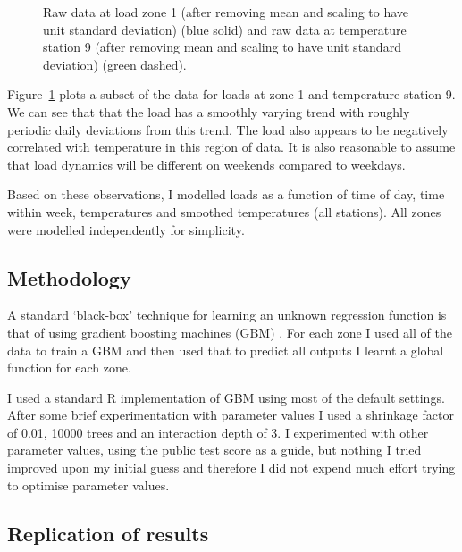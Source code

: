 \label{sec:gbm_init_anal}

\begin{figure}[ht]
  \begin{center}
    
  \end{center}
  \caption{Raw data at load zone 1 (after removing mean and scaling to have unit standard deviation) (blue solid) and raw data at temperature station 9 (after removing mean and scaling to have unit standard deviation) (green dashed).}
  \label{fig:load_temp}
\end{figure}

Figure~\ref{fig:load_temp} plots a subset of the data for loads at zone 1 and temperature station 9.
We can see that that the load has a smoothly varying trend with roughly periodic daily deviations from this trend.
The load also appears to be negatively correlated with temperature in this region of data.
It is also reasonable to assume that load dynamics will be different on weekends compared to weekdays.

Based on these observations, I modelled loads as a function of time of day, time within week, temperatures and smoothed temperatures (all stations).
All zones were modelled independently for simplicity.

\subsection{Methodology}

A standard `black-box' technique for learning an unknown regression function is that of using gradient boosting machines (GBM) \citep[e.g. chapter 10 of][]{Hastie2009-hj}.
For each zone I used all of the data to train a GBM and then used that to predict all outputs \ie I learnt a global function for each zone.

I used a standard R implementation of GBM using most of the default settings\footnotemark.
After some brief experimentation with parameter values I used a shrinkage factor of 0.01, 10000 trees and an interaction depth of 3.
I experimented with other parameter values, using the public test score as a guide, but nothing I tried improved upon my initial guess and therefore I did not expend much effort trying to optimise parameter values.


\subsection{Replication of results}

